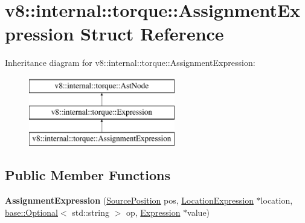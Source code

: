 \hypertarget{structv8_1_1internal_1_1torque_1_1AssignmentExpression}{}\section{v8\+:\+:internal\+:\+:torque\+:\+:Assignment\+Expression Struct Reference}
\label{structv8_1_1internal_1_1torque_1_1AssignmentExpression}
Inheritance diagram for v8\+:\+:internal\+:\+:torque\+:\+:Assignment\+Expression\+:\begin{figure}[H]
\begin{center}
\leavevmode
\includegraphics[height=3.000000cm]{structv8_1_1internal_1_1torque_1_1AssignmentExpression}
\end{center}
\end{figure}
\subsection*{Public Member Functions}
\begin{DoxyCompactItemize}
\item 
\mbox{\label{structv8_1_1internal_1_1torque_1_1AssignmentExpression_aa855e6d2502c09c78df5e6cce7a5acdd}} 
{\bfseries Assignment\+Expression} (\mbox{\hyperlink{structv8_1_1internal_1_1torque_1_1SourcePosition}{Source\+Position}} pos, \mbox{\hyperlink{structv8_1_1internal_1_1torque_1_1LocationExpression}{Location\+Expression}} $\ast$location, \mbox{\hyperlink{classv8_1_1base_1_1Optional}{base\+::\+Optional}}$<$ std\+::string $>$ op, \mbox{\hyperlink{structv8_1_1internal_1_1torque_1_1Expression}{Expression}} $\ast$value)
\end{DoxyCompactItemize}
